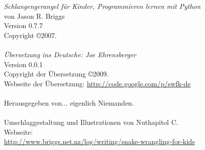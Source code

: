 \noindent
\textsf{\emph{Schlangengerangel für Kinder, Programmieren lernen mit Python}}\\
von Jason R. Briggs\\
Version 0.7.7
\\
Copyright \copyright 2007.\\
\\
\textsf{\emph{Übersetzung ins Deutsche: Joe Ehrensberger}}\\
Version 0.0.1\\
Copyright der Übersetzung \copyright 2009.\\
Webseite der Übersetzung: \href{http://code.google.com/p/swfk-de}{http://code.google.com/p/swfk-de}\\
\\
Herausgegeben von... eigenlich Niemanden.\\
\\
Umschlaggestaltung und Illustrationen von Nuthapitol C.\\
\linebreak 
\noindent
Webseite:\\ \href{http://www.briggs.net.nz/log/writing/snake-wrangling-for-kids}{http://www.briggs.net.nz/log/writing/snake-wrangling-for-kids}\\ 

